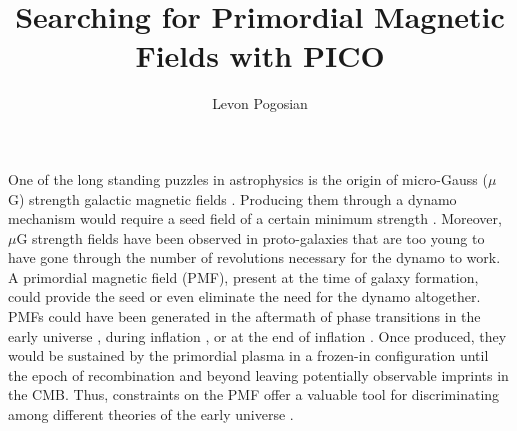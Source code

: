 \documentclass[article,aps,nofootinbib]{revtex4}
\begin{document}
\title{Searching for Primordial Magnetic Fields with PICO}

\author{Levon Pogosian}
\address{Department of Physics, Simon Fraser University, Burnaby, BC, V5A 1S6, Canada}


\maketitle


%
%
%
% 

One of the long standing puzzles in astrophysics is the origin of micro-Gauss ($\mu$G) strength galactic magnetic fields \cite{Widrow:2002ud}. Producing them through a dynamo mechanism would require a seed field of a certain minimum strength \cite{Widrow:2011hs}. Moreover, $\mu$G strength fields have been observed in proto-galaxies that are too young to have gone through the number of revolutions necessary for the dynamo to work. A primordial magnetic field (PMF), present at the time of galaxy formation, could provide the seed or even eliminate the need for the dynamo altogether. PMFs could have been generated in the aftermath of phase transitions in the early universe \cite{Vachaspati:1991nm}, during inflation \cite{Turner:1987bw,Ratra:1991bn}, or at the end of inflation \cite{DiazGil:2007dy}. Once produced, they would be sustained by the primordial plasma in a frozen-in configuration until the epoch of recombination and beyond leaving potentially observable imprints in the CMB. Thus, constraints on the PMF offer a valuable tool for discriminating among different theories of the early universe \cite{Barnaby:2012tk,Long:2013tha,Durrer:2013pga}.
\end{document}
